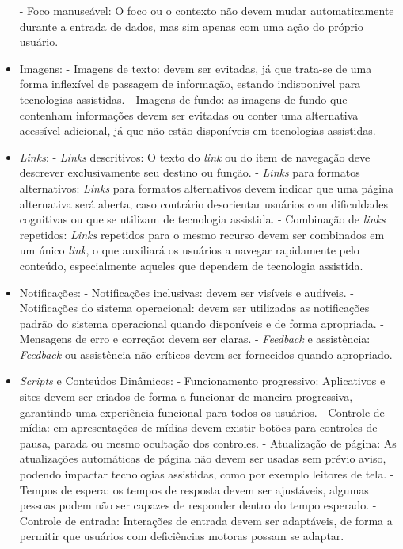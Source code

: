 \documentclass[
	12pt,				%
	oneside,			%
	a4paper,			%
	english,			%
	brazil				%
	]{abntex2ppgsi}
\begin{document}
\begin{itemize}
		\subitem - Foco manuseável: O foco ou o contexto não devem mudar automaticamente durante a entrada de dados, mas sim apenas com uma ação do próprio usuário.
	\item Imagens:
		\subitem - Imagens de texto: devem ser evitadas, já que trata-se de uma forma inflexível de passagem de informação, estando indisponível para tecnologias assistidas.
		\subitem - Imagens de fundo: as imagens de fundo que contenham informações devem ser evitadas ou conter uma alternativa acessível adicional, já que não estão disponíveis em tecnologias assistidas.
	\item \textit{Links}:
		\subitem - \textit{Links} descritivos: O texto do \textit{link} ou do item de navegação deve descrever exclusivamente seu destino ou função.
		\subitem - \textit{Links} para formatos alternativos: \textit{Links} para formatos alternativos devem indicar
		que uma página alternativa será aberta, caso contrário desorientar usuários com dificuldades cognitivas ou que se utilizam de tecnologia assistida.
		\subitem - Combinação de \textit{links} repetidos: \textit{Links} repetidos para o mesmo recurso devem ser combinados em um único \textit{link}, o que auxiliará os usuários a navegar rapidamente pelo conteúdo, especialmente aqueles que dependem de tecnologia assistida.
	\item Notificações:
		\subitem - Notificações inclusivas: devem ser visíveis e audíveis.
		\subitem - Notificações do sistema operacional: devem ser utilizadas as notificações padrão do sistema operacional quando disponíveis e de forma apropriada.
		\subitem - Mensagens de erro e correção: devem ser claras.
		\subitem - \textit{Feedback} e assistência: \textit{Feedback} ou assistência não críticos devem ser fornecidos quando apropriado.
	\item \textit{Scripts} e Conteúdos Dinâmicos:
		\subitem - Funcionamento progressivo: Aplicativos e sites devem ser criados de forma a funcionar de maneira progressiva, garantindo uma experiência funcional para todos os usuários.
		\subitem - Controle de mídia: em apresentações de mídias devem existir botões para controles de pausa, parada ou mesmo ocultação dos controles.
		\subitem - Atualização de página: As atualizações automáticas de página não devem ser usadas sem prévio aviso, podendo impactar tecnologias assistidas, como por exemplo leitores de tela.
		\subitem - Tempos de espera: os tempos de resposta devem ser ajustáveis, algumas pessoas podem não ser capazes de responder dentro do tempo esperado.
		\subitem - Controle de entrada: Interações de entrada devem ser adaptáveis, de forma a permitir que usuários com deficiências motoras possam se adaptar.

\end{itemize}
\end{document}
